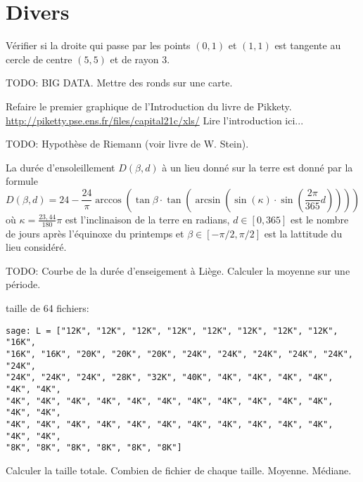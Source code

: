 
\section*{Divers}

\begin{exercice}
    Vérifier si la droite qui passe par les points $(0,1)$ et $(1,1)$ est
    tangente au cercle de centre $(5,5)$ et de rayon $3$.
\end{exercice}

\begin{exercice}
    TODO: BIG DATA. Mettre des ronds sur une carte.
\end{exercice}

\begin{exercice}
Refaire le premier graphique de l'Introduction du livre de Pikkety.
\url{http://piketty.pse.ens.fr/files/capital21c/xls/}
Lire l'introduction ici...
\end{exercice}

\begin{exercice}
    TODO: Hypothèse de Riemann (voir livre de W. Stein).
\end{exercice}

\begin{exercice}
La durée d'ensoleillement $D(\beta, d)$ à un lieu donné sur la terre est donné par
la formule
\[
D(\beta,d) = 24 - \frac{24}{\pi}\arccos\left( \tan \beta \cdot
\tan\left(\arcsin\left(\sin(\kappa)\cdot \sin\left(\frac{2\pi}{365}d
\right)\right)\right)\right)
\]
où $\kappa=\frac{23,44}{180}\pi$ est l'inclinaison de la terre en radians,
$d\in[0,365]$ est le nombre de jours après l'équinoxe du printemps et
$\beta\in[-\pi/2,\pi/2]$ est la lattitude du lieu considéré.


    TODO: Courbe de la durée d'enseigement à Liège. Calculer la moyenne sur
    une période.
\end{exercice}

\begin{exercice}
taille de 64 fichiers:
\begin{verbatim}
sage: L = ["12K", "12K", "12K", "12K", "12K", "12K", "12K", "12K", "16K",
"16K", "16K", "20K", "20K", "20K", "24K", "24K", "24K", "24K", "24K", "24K",
"24K", "24K", "24K", "28K", "32K", "40K", "4K", "4K", "4K", "4K", "4K", "4K",
"4K", "4K", "4K", "4K", "4K", "4K", "4K", "4K", "4K", "4K", "4K", "4K", "4K",
"4K", "4K", "4K", "4K", "4K", "4K", "4K", "4K", "4K", "4K", "4K", "4K", "4K",
"8K", "8K", "8K", "8K", "8K", "8K"] 
\end{verbatim}
Calculer la taille totale.
Combien de fichier de chaque taille.
Moyenne.
Médiane.
\end{exercice}


